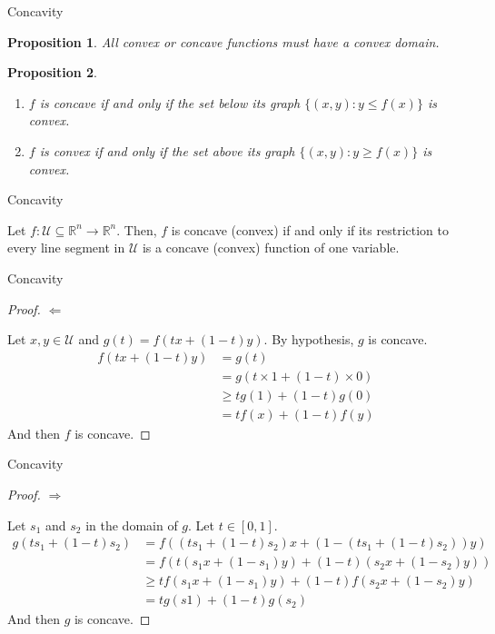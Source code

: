 \documentclass[aspectratio=169]{beamer}
\newtheorem{proposition}{Proposition}
\begin{document}
\begin{frame}{Concavity}
    \begin{proposition}
        All convex or concave functions must have a \textit{convex} domain.
    \end{proposition}

    \begin{proposition}
        \begin{enumerate}
            \item $f$ is concave if and only if the set below its graph $\{(x,y) : y \leq f(x)\}$ is convex.
            \item $f$ is convex if and only if the set above its graph $\{(x,y): y \geq f(x)\}$ is convex.
        \end{enumerate}    
    \end{proposition}
\end{frame}

\begin{frame}{Concavity}
    \begin{theorem}
        Let $f:\mathcal{U}\subseteq\mathbb{R}^n\rightarrow\mathbb{R}^n$. Then, $f$ is concave (convex) if and only if its restriction to every line segment in $\mathcal{U}$ is a concave (convex) function of one variable.
    \end{theorem}
\end{frame}

\begin{frame}{Concavity}
    \begin{proof}
        \(\Leftarrow\)

        Let $x,y\in\mathcal{U}$ and $g(t)=f(tx+(1-t)y)$. By hypothesis, $g$ is concave.
        \begin{align*}
            f(tx+(1-t)y)&=g(t)\\
            &=g(t\times 1+(1-t)\times 0)\\
            &\geq t g(1)+(1-t)g(0)\\
            &= tf(x)+(1-t)f(y)
        \end{align*}
        And then $f$ is concave.
    \end{proof}
\end{frame}

\begin{frame}{Concavity}
    \begin{proof}
        \(\Rightarrow\)
        
        Let $s_1$ and $s_2$ in the domain of $g$. Let $t\in[0,1]$.
        \begin{align*}
            g(ts_1+(1-t)s_2)&=f((ts_1+(1-t)s_2)x+(1-(ts_1+(1-t)s_2))y)\\
            &= f(t(s_1x+(1-s_1)y)+(1-t)(s_2x+(1-s_2)y))\\
            &\geq tf(s_1x+(1-s_1)y) + (1-t)f(s_2x+(1-s_2)y)\\
            &=tg(s1)+(1-t)g(s_2)
        \end{align*}
        And then $g$ is concave.
    \end{proof}
\end{frame}
\end{document}
